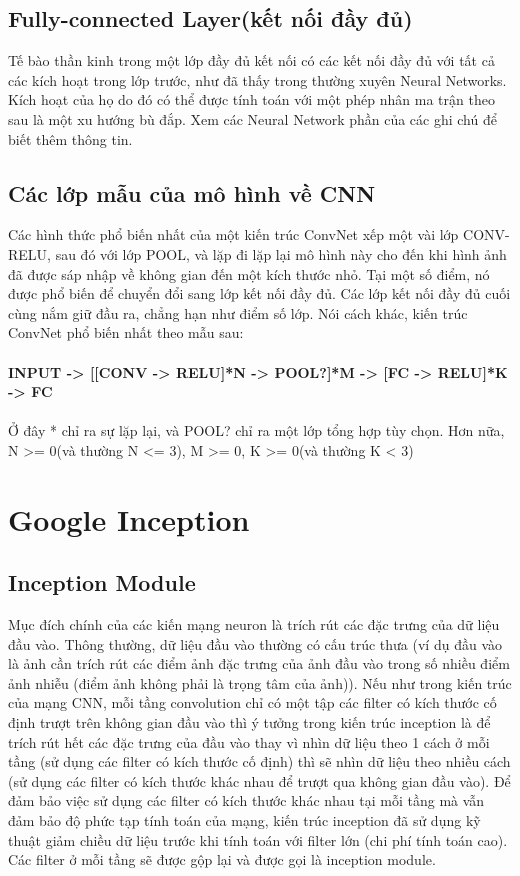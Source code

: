 \documentclass[a4paper,12pt]{report}
\begin{document}
\section{Fully-connected Layer(kết nối đầy đủ)}
Tế bào thần kinh trong một lớp đầy đủ kết nối có các kết nối đầy đủ với tất cả các kích hoạt trong lớp trước, như đã thấy trong thường xuyên Neural Networks. Kích hoạt của họ do đó có thể được tính toán với một phép nhân ma trận theo sau là một xu hướng bù đắp. Xem các Neural Network phần của các ghi chú để biết thêm thông tin.
\section{Các lớp mẫu của mô hình về CNN}
Các hình thức phổ biến nhất của một kiến trúc ConvNet xếp một vài lớp CONV-RELU, sau đó với lớp POOL, và lặp đi lặp lại mô hình này cho đến khi hình ảnh đã được sáp nhập về không gian đến một kích thước nhỏ. Tại một số điểm, nó được phổ biến để chuyển đổi sang lớp kết nối đầy đủ. Các lớp kết nối đầy đủ cuối cùng nắm giữ đầu ra, chẳng hạn như điểm số lớp. Nói cách khác, kiến trúc ConvNet phổ biến nhất theo mẫu sau: \\
\\
\small{
\textbf{INPUT -> [[CONV -> RELU]*N -> POOL?]*M -> [FC -> RELU]*K -> FC}
}
\\ \\
Ở đây * chỉ ra sự lặp lại, và POOL? chỉ ra một lớp tổng hợp tùy chọn. Hơn nữa, N >= 0(và thường N <= 3), M >= 0, K >= 0(và thường K < 3)


\chapter{Google Inception}
\section{Inception Module \cite{googlenet}}	
Mục đích chính của các kiến mạng neuron là trích rút các đặc trưng của dữ liệu đầu vào. Thông thường, dữ liệu đầu vào thường có cấu trúc thưa (ví dụ đầu vào là ảnh cần trích rút các điểm ảnh đặc trưng của ảnh đầu vào trong số nhiều điểm ảnh nhiễu (điểm ảnh không phải là trọng tâm của ảnh)). Nếu như trong kiến trúc của mạng CNN, mỗi tầng convolution chỉ có một tập các filter có kích thước cố định trượt trên không gian đầu vào thì ý tưởng trong kiến trúc inception là để trích rút hết các đặc trưng của đầu vào thay vì nhìn dữ liệu theo 1 cách ở mỗi tầng (sử dụng các filter có kích thước cố định) thì sẽ nhìn dữ liệu theo nhiều cách (sử dụng các filter có kích thước khác nhau để trượt qua không gian đầu vào). Để đảm bảo việc sử dụng các filter có kích thước khác nhau tại mỗi tầng mà vẫn đảm bảo độ phức tạp tính toán của mạng, kiến trúc inception đã sử dụng kỹ thuật giảm chiều dữ liệu trước khi tính toán với filter lớn (chi phí tính toán cao). Các filter ở mỗi tầng sẽ được gộp lại và được gọi là inception module.
\end{document}

